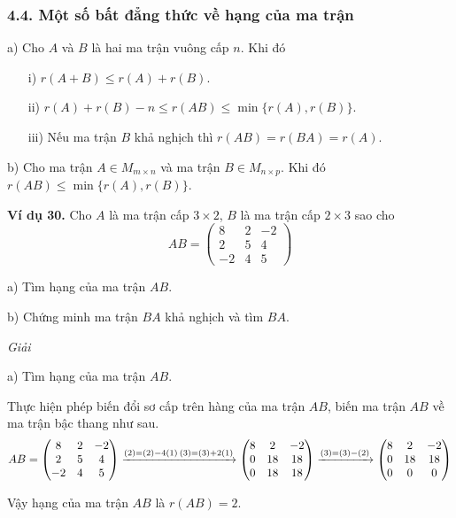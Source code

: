 \subsubsection*{4.4. Một số bất đẳng thức về hạng của ma trận}

a) Cho \( A \) và \( B \) là hai ma trận vuông cấp \( n \). Khi đó
\begin{itemize}
    \item[i)] \( r(A + B) \le r(A) + r(B) \).
    \item[ii)] \( r(A) + r(B) - n \le r(AB) \le \min\{r(A), r(B)\} \).
    \item[iii)] Nếu ma trận \( B \) khả nghịch thì \( r(AB) = r(BA) = r(A) \).
\end{itemize}
b) Cho ma trận \( A \in M_{m \times n} \) và ma trận \( B \in M_{n \times p} \). Khi đó \( r(AB) \le \min\{r(A), r(B)\} \).

\textbf{Ví dụ 30.} Cho \( A \) là ma trận cấp \( 3 \times 2 \), \( B \) là ma trận cấp \( 2 \times 3 \) sao cho
\[
AB = \begin{pmatrix}
8 & 2 & -2 \\
2 & 5 & 4 \\
-2 & 4 & 5
\end{pmatrix}
\]

a) Tìm hạng của ma trận \( AB \).

b) Chứng minh ma trận \( BA \) khả nghịch và tìm \( BA \).

\textit{Giải}

a) Tìm hạng của ma trận \( AB \).

Thực hiện phép biến đổi sơ cấp trên hàng của ma trận \( AB \), biến ma trận \( AB \) về ma trận bậc thang như sau.
\[
AB = \begin{pmatrix}
8 & 2 & -2 \\
2 & 5 & 4 \\
-2 & 4 & 5
\end{pmatrix}
\xrightarrow{(2) = (2) - 4(1) \\ (3) = (3) + 2(1)}
\begin{pmatrix}
8 & 2 & -2 \\
0 & 18 & 18 \\
0 & 18 & 18
\end{pmatrix}
\xrightarrow{(3) = (3) - (2)}
\begin{pmatrix}
8 & 2 & -2 \\
0 & 18 & 18 \\
0 & 0 & 0
\end{pmatrix}
\]

Vậy hạng của ma trận \( AB \) là \( r(AB) = 2 \).

